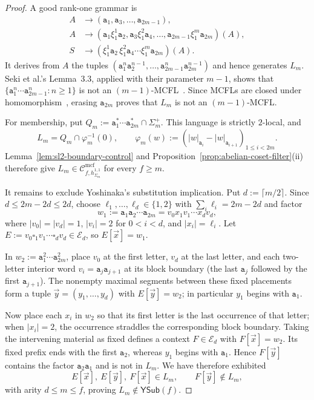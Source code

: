 \documentclass[11pt]{article}
\numberwithin{equation}{section}
\theoremstyle{plain}
\theoremstyle{definition}
\theoremstyle{remark}
\newcommand{\Cmcf}[2]{\mathcal{C}^{\mathrm{mcf}}_{#1,#2}}
\newcommand{\tuple}[1]{\vec{#1}}
\newcommand{\blank}{\square}
\newcommand{\YSub}[1]{\mathsf{YSub}(#1)}
\begin{document}
\begin{proof}
A good rank-one grammar is
\[
\begin{aligned}
  A&\to(\mathtt a_1,\mathtt a_3,\ldots,\mathtt a_{2m-1}),\\
  A&\to(\mathtt a_1\xi_1^1\mathtt a_2,
        \mathtt a_3\xi_1^2\mathtt a_4,\ldots,
        \mathtt a_{2m-1}\xi_1^m\mathtt a_{2m})(A),\\
  S&\to(\xi_1^1\mathtt a_2\,\xi_1^2\mathtt a_4\cdots
         \xi_1^m\mathtt a_{2m})(A).
\end{aligned}
\]
It derives from $A$ the tuples
$(\mathtt a_1^n\mathtt a_2^{n-1},\ldots,
  \mathtt a_{2m-1}^n\mathtt a_{2m}^{n-1})$ and hence generates $L_m$.
Seki et al.'s Lemma~3.3, applied with their parameter $m-1$,
shows that
$\{\mathtt a_1^n\cdots\mathtt a_{2m-1}^n:n\ge1\}$ is not an
$(m-1)$-MCFL~\cite[Lemma~3.3]{SekiEtAl1991}.  Since MCFLs are closed under
homomorphism~\cite[Theorem~3.9]{SekiEtAl1991}, erasing
$\mathtt a_{2m}$ proves that $L_m$ is not an $(m-1)$-MCFL.

For membership, put
$Q_m:=\mathtt a_1^*\cdots\mathtt a_{2m}^*\cap\Sigma_m^+$.
This language is strictly $2$-local, and
\[
  L_m=Q_m\cap\varphi_m^{-1}(0),\qquad
  \varphi_m(w):=(|w|_{\mathtt a_i}-|w|_{\mathtt a_{i+1}})_{1\le i<2m}.
\]
Lemma~\ref{lem:sl2-boundary-control} and
Proposition~\ref{prop:abelian-coset-filter}(ii) therefore give
$L_m\in\Cmcf{f}{h_{\Sigma_m}^{1,1}}$ for every $f\ge m$.

It remains to exclude Yoshinaka's substitution implication.  Put
$d:=\lceil m/2\rceil$.  Since
$d\le 2m-2d\le2d$, choose
$\ell_1,\ldots,\ell_d\in\{1,2\}$ with
$\sum_i\ell_i=2m-2d$ and factor
\[
  w_1:=\mathtt a_1\mathtt a_2\cdots\mathtt a_{2m}
      =v_0x_1v_1\cdots x_dv_d,
\]
where $|v_0|=|v_d|=1$, $|v_i|=2$ for $0<i<d$, and
$|x_i|=\ell_i$.  Let
$E:=v_0\blank_1v_1\cdots\blank_dv_d\in\mathcal E_d$, so
$E[\tuple x]=w_1$.

In
$w_2:=\mathtt a_1^2\cdots\mathtt a_{2m}^2$, place $v_0$ at the first letter,
$v_d$ at the last letter, and each two-letter interior word
$v_i=\mathtt a_j\mathtt a_{j+1}$ at its block boundary (the last
$\mathtt a_j$ followed by the first $\mathtt a_{j+1}$).  The nonempty maximal
segments between these fixed placements form a tuple
$\tuple y=(y_1,\ldots,y_d)$ with $E[\tuple y]=w_2$; in particular $y_1$
begins with $\mathtt a_1$.

Now place each $x_i$ in $w_2$ so that its first letter is the last occurrence
of that letter; when $|x_i|=2$, the occurrence straddles the corresponding
block boundary.  Taking the intervening material as fixed defines a context
$F\in\mathcal E_d$ with $F[\tuple x]=w_2$.  Its fixed prefix ends with the
first $\mathtt a_2$, whereas $y_1$ begins with $\mathtt a_1$.  Hence
$F[\tuple y]$ contains the factor $\mathtt a_2\mathtt a_1$ and is not in
$L_m$.  We have therefore exhibited
\[
  E[\tuple x],\ E[\tuple y],\ F[\tuple x]\in L_m,
  \qquad F[\tuple y]\notin L_m,
\]
with arity $d\le m\le f$, proving $L_m\notin\YSub{f}$.


\end{proof}
\end{document}
